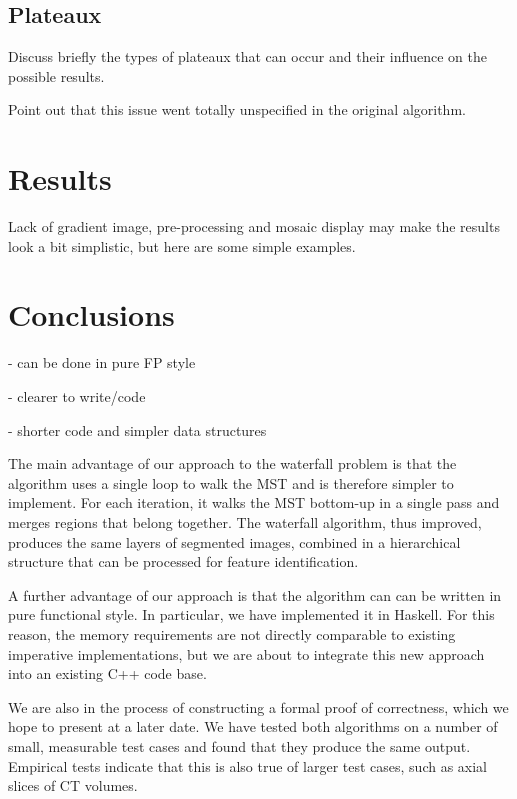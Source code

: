 \documentclass{jfp}
\begin{document}
\subsection{Plateaux}

Discuss briefly the types of plateaux that can occur and their
influence on the possible results.

Point out that this issue went totally unspecified in the original
algorithm.


\section{Results}

Lack of gradient image, pre-processing and mosaic display may make the
results look a bit simplistic, but here are some simple examples.


\section{Conclusions}

 - can be done in pure FP style


 - clearer to write/code

 - shorter code and simpler data structures


The main advantage of our approach to the waterfall problem is that
the algorithm uses a single loop to walk the MST and is therefore
simpler to implement. For each iteration, it walks the MST bottom-up
in a single pass and merges regions that belong together. The
waterfall algorithm, thus improved, produces the same layers of
segmented images, combined in a hierarchical structure that can be
processed for feature identification.

A further advantage of our approach is that the algorithm can can be
written in pure functional style. In particular, we have implemented
it in Haskell. For this reason, the memory requirements are not
directly comparable to existing imperative implementations, but we are
about to integrate this new approach into an existing C++ code base.

We are also in the process of constructing a formal proof of
correctness, which we hope to present at a later date. We have tested
both algorithms on a number of small, measurable test cases and found
that they produce the same output. Empirical tests indicate that this
is also true of larger test cases, such as axial slices of CT volumes.
\end{document}
